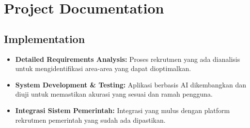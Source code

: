 \documentclass[journal,article,submit,pdftex,moreauthors]{Definitions/mdpi}
\begin{document}
\section{Project Documentation}
\subsection{Implementation}
\begin{itemize}[left=2em]
    \item \textbf{Detailed Requirements Analysis:} 
    Proses rekrutmen yang ada dianalisis untuk mengidentifikasi area-area yang dapat dioptimalkan.
    \item \textbf{System Development \& Testing:}
    Aplikasi berbasis AI dikembangkan dan diuji untuk memastikan akurasi yang sesuai dan ramah pengguna.
    \item \textbf{Integrasi Sistem Pemerintah:}
    Integrasi yang mulus dengan platform rekrutmen pemerintah yang sudah ada dipastikan.
\end{itemize}
\end{document}
